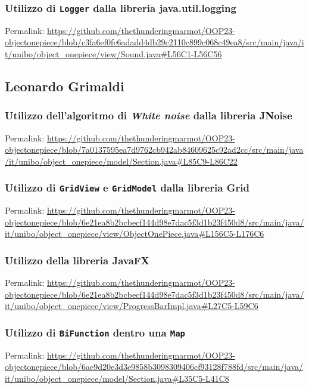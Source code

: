 \documentclass[a4paper,12pt]{report}
\begin{document}
\subsubsection{Utilizzo di \texttt{Logger} dalla libreria java.util.logging}
Permalink: \url{https://github.com/thethunderingmarmot/OOP23-objectonepiece/blob/c3fa6ef0fc6adadd4db29c2110c899c068c49ea8/src/main/java/it/unibo/object_onepiece/view/Sound.java#L56C1-L56C56}

\subsection*{Leonardo Grimaldi}

\subsubsection{Utilizzo dell'algoritmo di \textit{White noise} dalla libreria JNoise}

Permalink: \url{https://github.com/thethunderingmarmot/OOP23-objectonepiece/blob/7a0137595ea7d9762cb942ab84609625c92ad2cc/src/main/java/it/unibo/object_onepiece/model/Section.java#L85C9-L86C22}

\subsubsection{Utilizzo di \texttt{GridView} e \texttt{GridModel} dalla libreria Grid}

Permalink: \url{https://github.com/thethunderingmarmot/OOP23-objectonepiece/blob/6e21ea8b2bcbecf144d98e7dac5f3d1b23f450d8/src/main/java/it/unibo/object_onepiece/view/ObjectOnePiece.java#L156C5-L176C6}

\subsubsection{Utilizzo della libreria JavaFX}

Permalink: \url{https://github.com/thethunderingmarmot/OOP23-objectonepiece/blob/6e21ea8b2bcbecf144d98e7dac5f3d1b23f450d8/src/main/java/it/unibo/object_onepiece/view/ProgressBarImpl.java#L27C5-L59C6}

\subsubsection{Utilizzo di \texttt{BiFunction} dentro una \texttt{Map}}

Permalink: \url{https://github.com/thethunderingmarmot/OOP23-objectonepiece/blob/6ae9d20e3d3e9858b3098309406cf93128f788fd/src/main/java/it/unibo/object_onepiece/model/Section.java#L35C5-L41C8}
\end{document}
